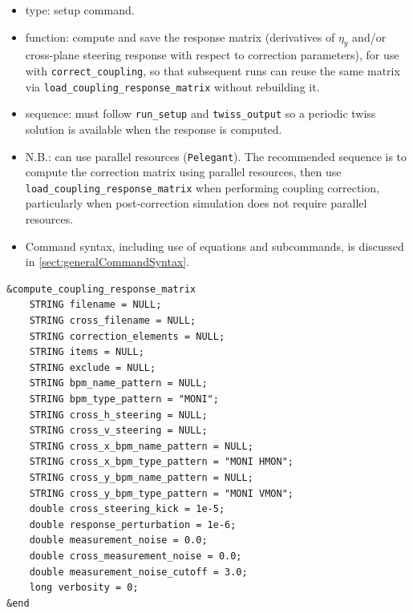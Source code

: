 \documentclass[11pt]{article}
\begin{document}
\begin{itemize}
\item type: setup command.
\item function: compute and save the response matrix (derivatives of $\eta_y$ and/or
  cross-plane steering response with respect to correction parameters), for use with
  \verb|correct_coupling|, so that subsequent runs can reuse the same matrix
  via \verb|load_coupling_response_matrix| without rebuilding it.
\item sequence: must follow \verb|run_setup| and \verb|twiss_output|
  so a periodic twiss solution is available when the response is computed.
\item N.B.: can use parallel resources (\verb|Pelegant|). The recommended sequence is to compute the correction
  matrix using parallel resources, then use \verb|load_coupling_response_matrix| when performing coupling
  correction, particularly when post-correction simulation does not require parallel resources.
\item Command syntax, including use of equations and subcommands, is discussed in \ref{sect:generalCommandSyntax}.
\end{itemize}

\begin{verbatim}
&compute_coupling_response_matrix
    STRING filename = NULL;
    STRING cross_filename = NULL;
    STRING correction_elements = NULL;
    STRING items = NULL;
    STRING exclude = NULL;
    STRING bpm_name_pattern = NULL;
    STRING bpm_type_pattern = "MONI";
    STRING cross_h_steering = NULL;
    STRING cross_v_steering = NULL;
    STRING cross_x_bpm_name_pattern = NULL;
    STRING cross_x_bpm_type_pattern = "MONI HMON";
    STRING cross_y_bpm_name_pattern = NULL;
    STRING cross_y_bpm_type_pattern = "MONI VMON";
    double cross_steering_kick = 1e-5;
    double response_perturbation = 1e-6;
    double measurement_noise = 0.0;
    double cross_measurement_noise = 0.0;
    double measurement_noise_cutoff = 3.0;
    long verbosity = 0;
&end
\end{verbatim}
\end{document}
